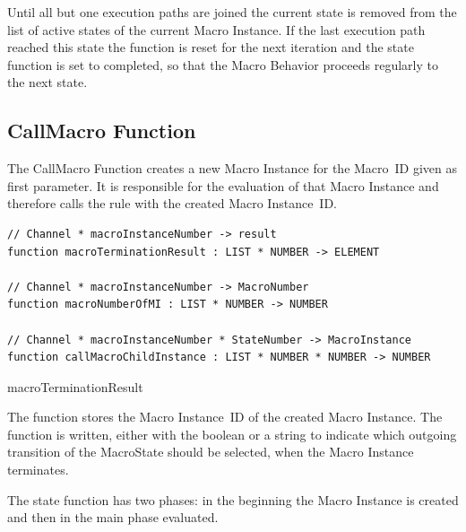 Until all but one execution paths are joined the current state is removed
from the list of active states of the current Macro Instance. If the last
execution path reached this state the  function is reset for the next
iteration and the state function is set to completed, so that the Macro Behavior proceeds
regularly to the next state.





\subsection{CallMacro Function}


The CallMacro Function creates a new Macro Instance for the Macro~ID given as
first parameter. It is responsible for the evaluation of that Macro Instance
and therefore calls the  rule with the created Macro
Instance~ID.


\begin{listing}[htbp]
\begin{verbatim}
// Channel * macroInstanceNumber -> result
function macroTerminationResult : LIST * NUMBER -> ELEMENT

// Channel * macroInstanceNumber -> MacroNumber
function macroNumberOfMI : LIST * NUMBER -> NUMBER

// Channel * macroInstanceNumber * StateNumber -> MacroInstance
function callMacroChildInstance : LIST * NUMBER * NUMBER -> NUMBER
\end{verbatim}
\caption{macroTerminationResult}
\label{lst:shortasm:macroTerminationResult}
\end{listing}



The  function stores the Macro Instance~ID
of the created Macro Instance. The 
function is written, either with the boolean  or a string to
indicate which outgoing transition of the MacroState should be selected, when the
Macro Instance terminates.

The state function has two phases: in the beginning the Macro Instance is created
and then in the main phase evaluated.



